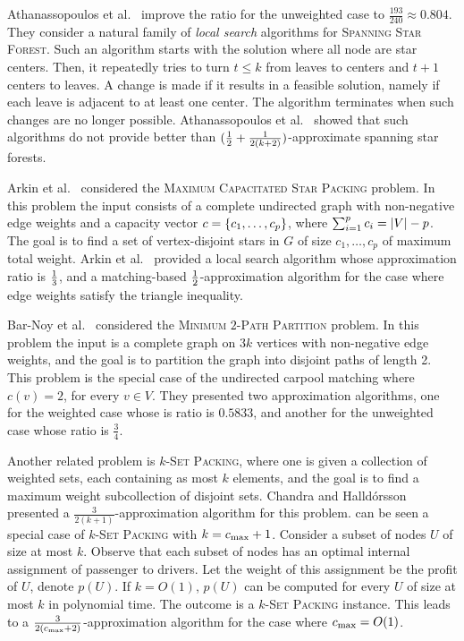 Athanassopoulos et al.~\cite{ACKK09} improve the ratio for the
unweighted case to $\frac{193}{240} \approx 0.804$.
%
They consider a natural family of \emph{local search} algorithms
for \textsc{Spanning Star Forest}.  Such an algorithm starts with the
solution where all node are star centers.  Then, it repeatedly tries
to turn $t \leq k$ from leaves to centers and $t+1$ centers to leaves.
A change is made if it results in a feasible solution, namely if each
leave is adjacent to at least one center.  The algorithm terminates
when such changes are no longer possible.  Athanassopoulos et
al.~\cite{ACKK09} showed that such algorithms do not provide better
than $(\frac{1}{2} + \frac{1}{2(k+2)})$-approximate spanning star forests.

Arkin et al.~\cite{arkin2004approximations} considered
the \textsc{Maximum Capacitated Star Packing} problem.  In this
problem the input consists of a complete undirected graph with
non-negative edge weights and a capacity vector $c
= \left\{ c_1,\ldots,c_p \right\}$, where $\sum_{i=1}^p c_i = \left| V \right| - p$.  The
goal is to find a set of vertex-disjoint stars in $G$ of size
$c_1,\ldots,c_p$ of maximum total weight.  Arkin et
al.~\cite{arkin2004approximations} provided a local search algorithm
whose approximation ratio is $\frac{1}{3}$, and a matching-based
$\frac{1}{2}$-approximation algorithm for the case where edge weights
satisfy the triangle inequality.

Bar-Noy et al.~\cite{bar2015improved} considered the
\textsc{Minimum $2$-Path Partition} problem.
In this problem the input is a complete graph on $3k$ vertices with
non-negative edge weights, and the goal is to partition the graph into
disjoint paths of length 2.  This problem is the special case of the
undirected carpool matching where $c(v) = 2$, for every $v \in V$.
They presented two approximation algorithms, one for the weighted case
whose is ratio is $0.5833$, and another for the unweighted case whose
ratio is $\frac{3}{4}$.

Another related problem is \textsc{$k$-Set Packing}, where one is
given a collection of weighted sets, each containing as most $k$
elements, and the goal is to find a maximum weight subcollection of
disjoint sets.  Chandra and Halld\'orsson~\cite{chandra2001greedy}
presented a $\frac{3}{2(k+1)}$-approximation algorithm for this
problem.
%
\carpool can be seen a special case of \textsc{$k$-Set Packing}
with $k = c_{\max} + 1$.  Consider a subset of nodes $U$ of size at most
$k$.  Observe that each subset of nodes has an optimal internal
assignment of passenger to drivers.  Let the weight of this assignment
be the profit of $U$, denote $p(U)$.  If $k = O(1)$, $p(U)$ can be
computed for every $U$ of size at most $k$ in polynomial time.  The
outcome is a \textsc{$k$-Set Packing} instance.  This leads to a
$\frac{3}{2(c_{\max}+2)}$-approximation algorithm for the case where
$c_{\max} = O(1)$.


